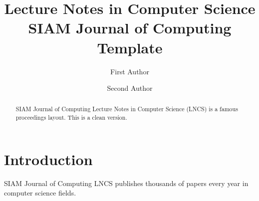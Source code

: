 \documentclass{llncs}
\begin{document}
\title{Lecture Notes in Computer Science SIAM Journal of Computing Template}
\author{First Author \and Second Author}
\maketitle

\begin{abstract}
SIAM Journal of Computing Lecture Notes in Computer Science (LNCS) is a famous proceedings layout. This is a clean version.
\end{abstract}

\section{Introduction}
SIAM Journal of Computing LNCS publishes thousands of papers every year in computer science fields.
\end{document}
